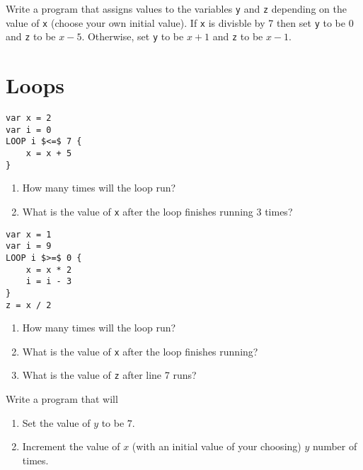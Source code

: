 \documentclass{article}
\begin{document}
\begin{Exercise}

Write a program that assigns values to the variables \lstinline{y} and \lstinline{z} depending on the value of \lstinline{x} (choose your own initial value).
If \lstinline{x} is divisble by 7 then set \lstinline{y} to be $0$ and \lstinline{z} to be $x - 5$.
Otherwise, set \lstinline{y} to be $x + 1$ and \lstinline{z} to be $x - 1$.

\end{Exercise}

\section{Loops}

\begin{Exercise}
\begin{lstlisting}[caption={Pseudocode.}, label={code:exercise_loop_1},mathescape]
var x = 2
var i = 0
LOOP i $<=$ 7 {
    x = x + 5
}
\end{lstlisting}

\begin{enumerate}
\item How many times will the loop run?
\item What is the value of \lstinline{x} after the loop finishes running $3$ times?
\end{enumerate}
\end{Exercise}

\begin{Exercise}
\begin{lstlisting}[caption={Pseudocode.}, label={code:exercise_loop_2},mathescape]
var x = 1
var i = 9
LOOP i $>=$ 0 {
    x = x * 2
    i = i - 3
}
z = x / 2
\end{lstlisting}

\begin{enumerate}
\item How many times will the loop run?
\item What is the value of \lstinline{x} after the loop finishes running?
\item What is the value of \lstinline{z} after line 7 runs?
\end{enumerate}
\end{Exercise}

\begin{Exercise}

Write a program that will
\begin{enumerate}
\item Set the value of $y$ to be $7$.
\item Increment the value of $x$ (with an initial value of your choosing) $y$ number of times.
\end{enumerate}

\end{Exercise}
\end{document}
